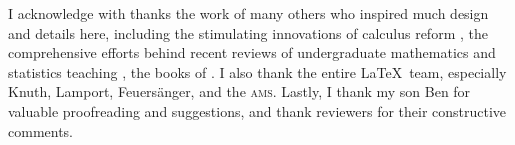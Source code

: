 I acknowledge with thanks the work of many others who inspired much design and details here, including 
the stimulating innovations of calculus reform \cite[e.g.]{HughesHallett2013},  
the comprehensive efforts behind recent reviews of  undergraduate mathematics and statistics teaching \cite[e.g.]{Alpers2013, Bressoud2014, Turner2014, StatsEduGuidelines2014, CUPMguide2015, gaimme2016}, 
the books of \cite{Anton6, Davis99a, Holt2013, Larson2013, Lay2012, Nakos1998, Poole2015, Will04}.
I also thank the entire \LaTeX\ team, especially Knuth, Lamport, Feuers\"anger, and the \textsc{ams}.
Lastly, I thank my son Ben for valuable proofreading and suggestions, and thank reviewers for their constructive comments. 







